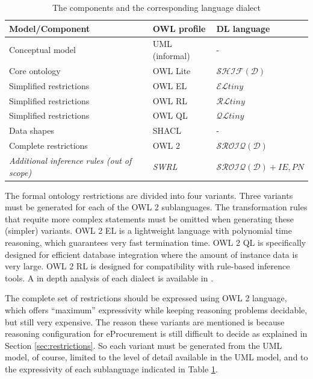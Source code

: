 	\begin{table}[!ht]
		\centering
		\begin{tabular}{@{}lll@{}}
			\toprule
			Model/Component         & OWL profile    & DL language \\ \midrule
			Conceptual model        & UML (informal) & -           \\
			Core ontology           & OWL Lite       & $\mathcal{SHIF(D)}$     \\
			Simplified restrictions & OWL EL         & $\mathcal{EL}tiny$      \\
			Simplified restrictions & OWL RL         & $\mathcal{RL}tiny$      \\
			Simplified restrictions & OWL QL         & $\mathcal{QL}tiny$      \\
			Data shapes             & SHACL          & -           \\
			Complete restrictions   & OWL 2          & $\mathcal{SROIQ(D)}$    \\
			\textit{Additional inference rules (out of scope)} & \textit{SWRL} & \textit{$\mathcal{SROIQ(D)} + IE, PN$} \\ \bottomrule
		\end{tabular}
		\caption{The components and the corresponding language dialect}
		\label{tab:expressivity}
	\end{table}
	
	The formal ontology restrictions are divided into four variants. Three variants must be generated for each of the OWL 2 sublanguages. The transformation rules that requite more complex statements must be omitted when generating these (simpler) variants. OWL 2 EL is a lightweight language with polynomial time reasoning, which guarantees very fast termination time. OWL 2 QL is specifically designed for efficient database integration where the amount of instance data is very large. OWL 2 RL is designed for compatibility with rule-based inference tools.	A in depth analysis of each dialect is available in \citep{krotzsch2012owl}.
		
	The complete set of restrictions should be expressed using OWL 2 language, which offers ``maximum'' expressivity while keeping reasoning problems
	decidable, but still very expensive. The reason these variants are mentioned is because reasoning configuration for eProcurement is still difficult to decide as explained in Section \ref{sec:restrictions}. So each variant must be generated from the UML model, of course, limited to the level of detail available in the UML model, and to the expressivity of each sublanguage indicated in Table \ref{tab:expressivity}.
	
